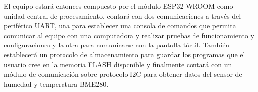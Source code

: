 El equipo estará entonces compuesto por el módulo ESP32-WROOM como unidad central de procesamiento, contará con dos comunicaciones a través del periférico UART, una para establecer una consola de comandos que permita comunicar al equipo con una computadora y realizar pruebas de funcionamiento y configuraciones y la otra para comunicarse con la pantalla táctil. También establecerá un protocolo de almacenamiento para guardar los programas que el usuario cree en la memoria FLASH disponible y finalmente contará con un módulo de comunicación sobre protocolo I2C para obtener datos del sensor de humedad y temperatura BME280.  


